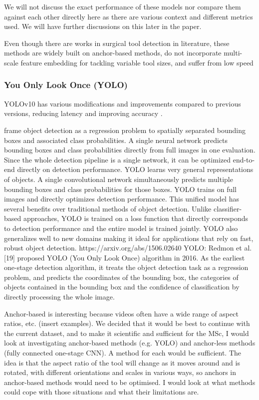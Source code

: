 We will not discuss the exact performance of these models nor compare them against each other directly here as there are various context and different metrics used. We will have further discussions on this later in the paper.

Even though there are works in surgical tool detection in literature, these methods are widely built on anchor-based methods, do not incorporate multi-scale feature embedding for tackling variable tool sizes, and suffer from low speed

\subsubsection{You Only Look Once (YOLO)}

YOLOv10 has various modifications and improvements compared to previous versions, reducing latency and improving accuracy \cite{noauthor_yolov10_nodate}. 

frame object detection as a regression problem to spatially separated bounding boxes and associated class probabilities. A single neural network predicts bounding boxes and class probabilities directly from full images in one evaluation. Since the whole detection pipeline is a single network, it can be optimized end-to-end directly on detection performance. YOLO learns very general representations of objects. A single convolutional network simultaneously predicts multiple bounding boxes and class probabilities for those boxes. YOLO trains on full images and directly optimizes detection performance. This unified model has several benefits over traditional methods of object detection. Unlike classifier-based approaches, YOLO is trained on a loss function that directly corresponds to detection performance and the entire model is trained jointly. YOLO also generalizes well to new domains making it ideal for applications that rely on fast, robust object detection. https://arxiv.org/abs/1506.02640
YOLO: Redmon et al.[19] proposed YOLO (You Only Look Once) algorithm in 2016. As the earliest one-stage detection algorithm, it treats the object detection task as a regression problem, and predicts the coordinates of the bounding box, the categories of objects contained in the bounding box and the confidence of classification by directly processing the whole image. 

Anchor-based is interesting because videos often have a wide range of aspect ratios, etc. (insert examples). We decided that it would be best to continue with the current dataset, and to make it scientific and sufficient for the MSc, I would look at investigating anchor-based methods (e.g. YOLO) and anchor-less methods (fully connected one-stage CNN). A method for each would be sufficient. The idea is that the aspect ratio of the tool will change as it moves around and is rotated, with different orientations and scales in various ways, so anchors in anchor-based methods would need to be optimised. I would look at what methods could cope with those situations and what their limitations are.

